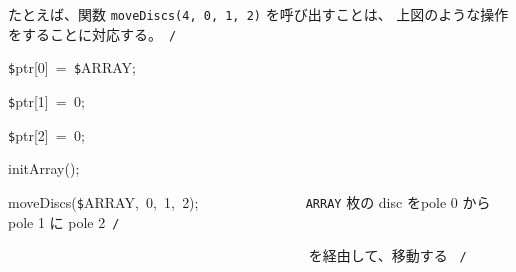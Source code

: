 \documentclass[a4paper,10pt]{article}
\def\mc{\relax}
\begin{document}
たとえば、関数 {\tt moveDiscs(4, 0, 1, 2)} を呼び出すことは、
上図のような操作をすることに対応する。\hfill \rm\mc \ {\tt *}{\tt /}
\tt\mc 

\noindent
\mbox{}\hfill

\noindent
\mbox{}{\tt\$}ptr[0]{\tt\mc \ }={\tt\mc \ }{\tt\$}ARRAY;

\noindent
\mbox{}{\tt\$}ptr[1]{\tt\mc \ }={\tt\mc \ }0;

\noindent
\mbox{}{\tt\$}ptr[2]{\tt\mc \ }={\tt\mc \ }0;

\noindent
\mbox{}\hfill

\noindent
\mbox{}initArray();

\noindent
\mbox{}moveDiscs({\tt\$}ARRAY,{\tt\mc \ }0,{\tt\mc \ }1,{\tt\mc \ }2);{\tt\mc \ }{\tt\mc \ }{\tt\mc \ }{\tt\mc \ }{\tt\mc \ }{\tt\mc \ }{\tt\mc \ }{\tt\mc \ }{\tt\mc \ }{\tt\mc \ }{\tt\mc \ }{\tt\mc \ }{\tt\mc \ }\rm\mc {\tt /}{\tt *}\  \ {\tt ARRAY} 枚の disc をpole 0 から pole 1 に pole 2\hfill \rm\mc \ {\tt *}{\tt /}
\tt\mc 

\noindent
\mbox{}{\tt\mc \ }{\tt\mc \ }{\tt\mc \ }{\tt\mc \ }{\tt\mc \ }{\tt\mc \ }{\tt\mc \ }{\tt\mc \ }{\tt\mc \ }{\tt\mc \ }{\tt\mc \ }{\tt\mc \ }{\tt\mc \ }{\tt\mc \ }{\tt\mc \ }{\tt\mc \ }{\tt\mc \ }{\tt\mc \ }{\tt\mc \ }{\tt\mc \ }{\tt\mc \ }{\tt\mc \ }{\tt\mc \ }{\tt\mc \ }{\tt\mc \ }{\tt\mc \ }{\tt\mc \ }{\tt\mc \ }{\tt\mc \ }{\tt\mc \ }{\tt\mc \ }{\tt\mc \ }{\tt\mc \ }{\tt\mc \ }{\tt\mc \ }{\tt\mc \ }{\tt\mc \ }{\tt\mc \ }{\tt\mc \ }{\tt\mc \ }\rm\mc {\tt /}{\tt *}\  \ を経由して、移動する \hfill \rm\mc \ {\tt *}{\tt /}

\tt\mc 

\rm\mc
\end{document}
